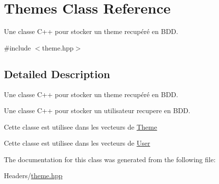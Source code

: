 \hypertarget{classThemes}{}\section{Themes Class Reference}
\label{classThemes}


Une classe C++ pour stocker un theme recupéré en B\+DD.  




{\ttfamily \#include $<$theme.\+hpp$>$}



\subsection{Detailed Description}
Une classe C++ pour stocker un theme recupéré en B\+DD. 

Une classe C++ pour stocker un utilisateur recupere en B\+DD.

Cette classe est utilisee dans les vecteurs de \mbox{\hyperlink{classTheme}{Theme}}

Cette classe est utilisee dans les vecteurs de \mbox{\hyperlink{classUser}{User}} 

The documentation for this class was generated from the following file\+:\begin{DoxyCompactItemize}
\item 
Headers/\mbox{\hyperlink{theme_8hpp}{theme.\+hpp}}\end{DoxyCompactItemize}
